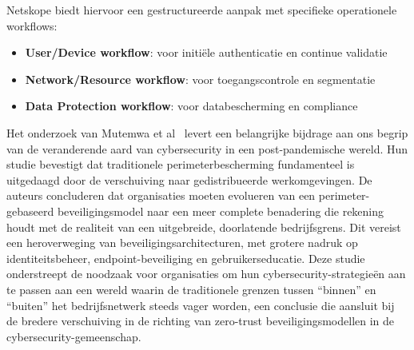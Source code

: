 Netskope biedt hiervoor een gestructureerde aanpak met specifieke operationele workflows:

\begin{itemize}
  \item \textbf{User/Device workflow}: voor initiële authenticatie en continue validatie
  \item \textbf{Network/Resource workflow}: voor toegangscontrole en segmentatie
  \item \textbf{Data Protection workflow}: voor databescherming en compliance
\end{itemize}

Het onderzoek van Mutemwa et al~\autocite{ACM2021} levert een belangrijke bijdrage aan ons begrip van de veranderende aard van cybersecurity in een post-pandemische wereld. Hun studie bevestigt dat traditionele perimeterbescherming fundamenteel is uitgedaagd door de verschuiving naar gedistribueerde werkomgevingen.
De auteurs concluderen dat organisaties moeten evolueren van een perimeter-gebaseerd beveiligingsmodel naar een meer complete benadering die rekening houdt met de realiteit van een uitgebreide, doorlatende bedrijfsgrens. Dit vereist een heroverweging van beveiligingsarchitecturen, met grotere nadruk op identiteitsbeheer, endpoint-beveiliging en gebruikerseducatie.
Deze studie onderstreept de noodzaak voor organisaties om hun cybersecurity-strategieën aan te passen aan een wereld waarin de traditionele grenzen tussen “binnen” en “buiten” het bedrijfsnetwerk steeds vager worden, een conclusie die aansluit bij de bredere verschuiving in de richting van zero-trust beveiligingsmodellen in de cybersecurity-gemeenschap.